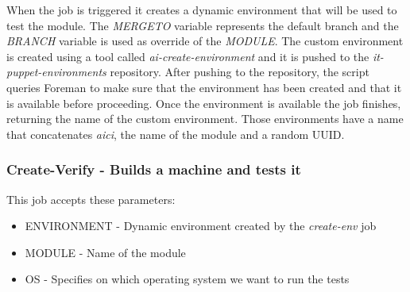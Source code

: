 When the job is triggered it creates a dynamic environment that will be
used to test the module. The \textit{MERGETO} variable represents the
default branch and the \textit{BRANCH} variable is used as override of the
\textit{MODULE}. The custom environment is created using a tool called
\textit{ai-create-environment} and it is pushed to the
\textit{it-puppet-environments} repository. After pushing to the
repository, the script queries Foreman to make sure that the environment
has been created and that it is available before proceeding. Once the
environment is available the job finishes, returning the name of the
custom environment. Those environments have a name that concatenates
\textit{aici}, the name of the module and a random UUID.

\subsubsection{Create-Verify - Builds a machine and tests it}

This job accepts these parameters:

\begin{itemize}
  \item ENVIRONMENT - Dynamic environment created by the \textit{create-env} job
  \item MODULE - Name of the module
  \item OS - Specifies on which operating system we want to run the tests
\end{itemize}


